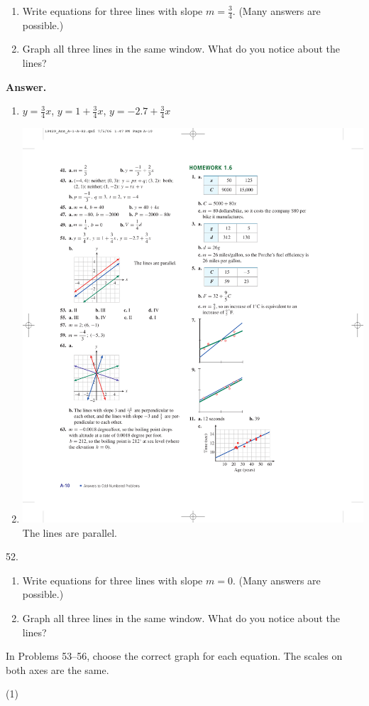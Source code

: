 \documentclass[10pt,]{book}
\theoremstyle{plain}
\theoremstyle{definition}
\theoremstyle{definition}
\theoremstyle{definition}
\theoremstyle{definition}
\numberwithin{equation}{part}
\begin{document}
\begin{exerciselist}
\begin{enumerate}[label=*\alph**]
\item\hypertarget{li-1247}{}Write equations for three lines with slope \(m = \frac{3}{4}\). (Many answers are possible.)%
\item\hypertarget{li-1248}{}Graph all three lines in the same window. What do you notice about the lines?%
\end{enumerate}
%
\par\smallskip
\par\smallskip
\noindent\textbf{Answer.}\hypertarget{answer-189}{}\quad
\leavevmode%
\begin{enumerate}[label=*\alph**]
\item\hypertarget{li-1249}{}\(y = \frac{3}{4}x\), \(y = 1 + \frac{3}{4}x\), \(y = -2.7 + \frac{3}{4}x\)%
\item\hypertarget{li-1250}{}\includegraphics[width=0.4\linewidth]{images/fig-ans-1-5-51}
 The lines are parallel.%
\end{enumerate}
%
\item[52.]\hypertarget{exercise-338}{}\leavevmode%
\begin{enumerate}[label=*\alph**]
\item\hypertarget{li-1251}{}Write equations for three lines with slope \(m =0\). (Many answers are possible.)%
\item\hypertarget{li-1252}{}Graph all three lines in the same window. What do you notice about the lines?%
\end{enumerate}
%
\par\smallskip
\hypertarget{exercisegroup-44}{}\par\noindent In Problems 53–56, choose the correct graph for each equation. The scales on both axes are the same.%
\begin{exercisegroup}(1)
\exercise[53.]\hypertarget{exercise-339}{}\leavevmode%
\begin{multicols}{2}

\end{multicols}
\end{exercisegroup}
\end{exerciselist}
\end{document}
